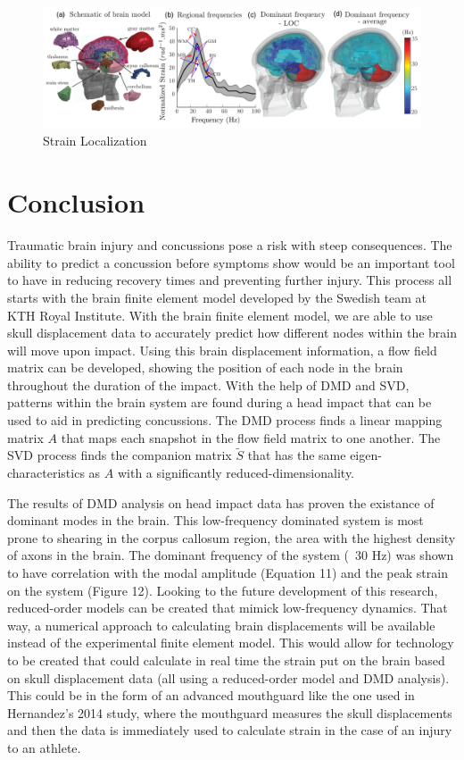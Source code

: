 \documentclass[%
 aip,
 amsmath,amssymb,
 reprint,%
 floatfix,%
]{revtex4-1}
\begin{document}
\begin{figure}
	\centering
	\includegraphics[scale=0.23]{localization.png}
	\caption{Strain Localization}
\end{figure}

\section{\label{sec:level6}Conclusion}


Traumatic brain injury and concussions pose a risk with steep consequences. The ability to predict a concussion before symptoms show would be an important tool to have in reducing recovery times and preventing further injury. This process all starts with the brain finite element model developed by the Swedish team at KTH Royal Institute. With the brain finite element model, we are able to use skull displacement data to accurately predict how different nodes within the brain will move upon impact. Using this brain displacement information, a flow field matrix can be developed, showing the position of each node in the brain throughout the duration of the impact. With the help of DMD and SVD, patterns within the brain system are found during a head impact that can be used to aid in predicting concussions. The DMD process finds a linear mapping matrix $A$ that maps each snapshot in the flow field matrix to one another. The SVD process finds the companion matrix $\tilde S$ that has the same eigen-characteristics as $A$ with a significantly reduced-dimensionality. 

The results of DMD analysis on head impact data has proven the existance of dominant modes in the brain. This low-frequency dominated system is most prone to shearing in the corpus callosum region, the area with the highest density of axons in the brain. The dominant frequency of the system (~30 Hz) was shown to have correlation with the modal amplitude (Equation 11) and the peak strain on the system (Figure 12). Looking to the future development of this research, reduced-order models can be created that mimick low-frequency dynamics. That way, a numerical approach to calculating brain displacements will be available instead of the experimental finite element model. This would allow for technology to be created that could calculate in real time the strain put on the brain based on skull displacement data (all using a reduced-order model and DMD analysis). This could be in the form of an advanced mouthguard like the one used in Hernandez's 2014 study, where the mouthguard measures the skull displacements and then the data is immediately used to calculate strain in the case of an injury to an athlete.
\end{document}
